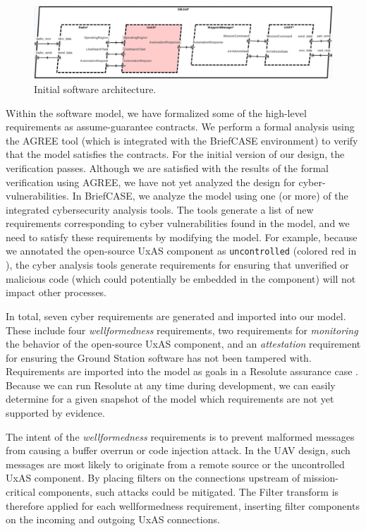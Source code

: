 \begin{figure}[h]
	\centering
	\includegraphics[width=1\columnwidth]{figs/sw-initial.png}
	\caption{Initial software architecture.}
	\label{fig:sw-initial}
\end{figure}

Within the software model, we have formalized some of the high-level requirements as assume-guarantee contracts.  We perform a formal analysis using the AGREE tool (which is integrated with the BriefCASE environment) to verify that the model satisfies the contracts.  For the initial version of our design, the verification passes.
%
Although we are satisfied with the results of the formal verification using AGREE, we have not yet analyzed the design for cyber-vulnerabilities.
In BriefCASE, we analyze the model using one (or more) of the integrated cybersecurity analysis tools.
The tools generate a list of new requirements corresponding to cyber vulnerabilities found in the model,
and we need to satisfy these requirements by modifying the model.
%
For example, because we annotated the open-source UxAS component as \texttt{uncontrolled} (colored red in ),
the cyber analysis tools generate requirements for ensuring that unverified or malicious code (which could potentially be embedded in the component) will not impact other processes.

In total, seven cyber requirements are generated and imported into our model.  These include four \textit{wellformedness} requirements, two requirements for \textit{monitoring} the behavior of the open-source UxAS component, and an \textit{attestation} requirement for ensuring the Ground Station software has not been tampered with.  Requirements are imported into the model as goals in a Resolute assurance case \cite{resolute-destion}.  Because we can run Resolute at any time during development, we can easily determine for a given snapshot of the model which requirements are not yet supported by evidence.

The intent of the \textit{wellformedness} requirements is to prevent
malformed messages from causing a buffer overrun or code injection
attack.  In the UAV design, such messages are most likely to originate
from a remote source or the uncontrolled UxAS component.  By placing
filters on the connections upstream of mission-critical components,
such attacks could be mitigated.  The Filter transform is therefore
applied for each wellformedness requirement, inserting filter
components on the incoming and outgoing UxAS connections.

